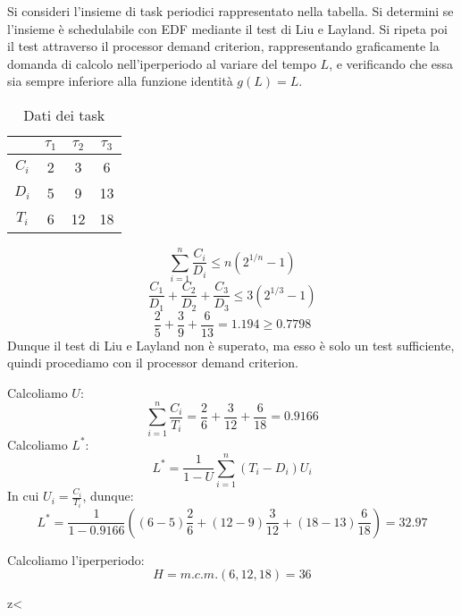 \begin{Esercizio7}

Si consideri l'insieme di task periodici rappresentato nella tabella.  
Si determini se l'insieme è schedulabile con EDF mediante il test di Liu e Layland.  
Si ripeta poi il test attraverso il processor demand criterion, 
rappresentando graficamente la domanda di calcolo nell'iperperiodo
al variare del tempo $L$, e verificando che essa sia sempre inferiore 
alla funzione identità $g(L)=L$.

\begin{table}[!h]
\centering
\caption{Dati dei task}
\begin{tabular}{|c|c|c|c|}
\hline
 & $\tau_1$ & $\tau_2$ & $\tau_3$ \\
\hline
$C_i$ & 2 & 3 & 6 \\
\hline
$D_i$ & 5 & 9 & 13 \\
\hline
$T_i$ & 6 & 12 & 18 \\
\hline
\end{tabular}
\label{tab:edf_tasks}
\end{table}


\[ 
\sum_{i=1}^{n} \frac{C_{i}}{D_{i}} \le n (2^{1/n} - 1)
\]
\[ \frac{C_{1}}{D_{1}} + \frac{C_{2}}{D_{2}} + \frac{C_{3}}{D_{3}} \le 3 (2^{1/3} - 1) \]
\[ \frac{2}{5} + \frac{3}{9} + \frac{6}{13} = 1.194 \ge 0.7798 \]
Dunque il test di Liu e Layland non è superato, ma esso è solo un test sufficiente,
quindi procediamo con il processor demand criterion.

Calcoliamo \(U\):
\[
\sum_{i=1}^{n} \frac{C_{i}}{T_{i}} = \frac{2}{6} + \frac{3}{12} + \frac{6}{18} = 0.9166  
\]
Calcoliamo \(L^{*}\):
\[
L^{*} = \frac{1}{1-U}\sum_{i=1}^{n} (T_{i} - D_{i}) U_{i} 
\]
In cui \(U_{i} = \displaystyle \frac{C_{i}}{T_{i}}\), dunque:
\[
L^{*} = \frac{1}{1-0.9166} 
\left( (6-5) \frac{2}{6} + (12-9) \frac{3}{12} + (18-13) \frac{6}{18} \right) = 32.97
\]

Calcoliamo l'iperperiodo:
\[ H = m.c.m.(6, 12, 18) = 36 \]


z<
\begin{figure}[h]
\centering
{}
\end{figure}

\end{Esercizio7}


